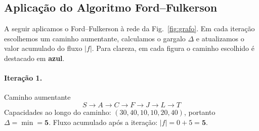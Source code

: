 \documentclass[12pt]{article}
\begin{document}
\newpage
\subsection{Aplicação do Algoritmo Ford--Fulkerson}

A seguir aplicamos o Ford--Fulkerson à rede da Fig.~\ref{fig:grafo}. Em cada iteração escolhemos um caminho aumentante, calculamos o gargalo \(\Delta\) e atualizamos o valor acumulado do fluxo \( |f|\). Para clareza, em cada figura o caminho escolhido é destacado em \textbf{azul}.





























\paragraph{Iteração 1.} Caminho aumentante
\[
S \to A \to C \to F \to J \to L \to T
\]
Capacidades ao longo do caminho: \((30,40,10,10,20,40)\), portanto \(\Delta = \min = \mathbf{5}\).
Fluxo acumulado após a iteração: \(|f|= 0+5 = \mathbf{5}\).
\end{document}
